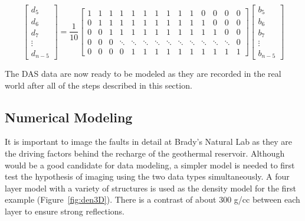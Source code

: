 \setcounter{MaxMatrixCols}{20}
\begin{equation}
\begin{bmatrix}
d_5 \\
d_6 \\
d_7 \\
\vdots \\
d_{n-5}
\end{bmatrix}
=
\frac{1}{10}
\begin{bmatrix}
1 & 1 & 1 & 1 & 1 & 1 & 1 & 1 & 1 & 1 & 0 & 0 & 0 & 0 \\
0 & 1 & 1 & 1 & 1 & 1 & 1 & 1 & 1 & 1 & 1 & 0 & 0 & 0 \\
0 & 0 & 1 & 1 & 1 & 1 & 1 & 1 & 1 & 1 & 1 & 1 & 0 & 0 \\
0 & 0 & 0 & \ddots  & \ddots & \ddots & \ddots & \ddots & \ddots & \ddots & \ddots & \ddots & \ddots & 0\\
0 & 0 & 0 & 0 & 1 & 1 & 1 & 1 & 1 & 1 & 1 & 1 & 1 & 1
\end{bmatrix}
\begin{bmatrix}
  b_5 \\
  b_6 \\
  b_7 \\
  \vdots \\
  b_{n-5}
\end{bmatrix}
\label{eqn:GaugeLength}
\end{equation}

The DAS data are now ready to be modeled as they are recorded in the real world after all of the steps described in this section.

\subsection{Numerical Modeling}
It is important to image the faults in detail at Brady's Natural Lab as they are the driving factors behind the recharge of the geothermal reservoir. Although \citet{siler2013three} would be a good candidate for data modeling, a simpler model is needed to first test the hypothesis of imaging using the two data types simultaneously. A four layer model with a variety of structures is used as the density model for the first example (Figure~\ref{fig:den3D}). There is a contrast of about 300 g/cc between each layer to ensure strong reflections.


